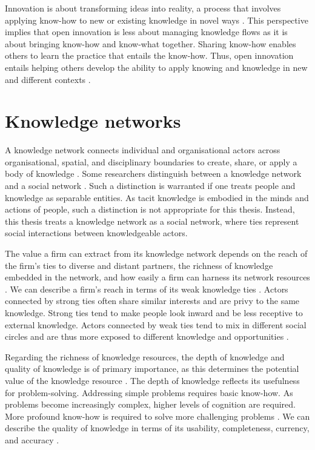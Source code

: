 Innovation is about transforming ideas into reality, a process that involves applying know-how to new or existing knowledge in novel ways \citep{van1986central,quintane2011innovation,garud2013perspectives}. This perspective implies that open innovation is less about managing knowledge flows as it is about bringing know-how and know-what together. Sharing know-how enables others to learn the practice that entails the know-how. Thus, open innovation entails helping others develop the ability to apply knowing and knowledge in new and different contexts \citep{van1986central,goksel2016can}. 

\section{Knowledge networks}

A knowledge network connects individual and organisational actors across organisational, spatial, and disciplinary boundaries to create, share, or apply a body of knowledge \citep{pugh2013designing}. Some researchers distinguish between a knowledge network and a social network \citep[e.g.][]{yayavaram2008decomposability,wang2014knowledge,brennecke2017firm}. Such a distinction is warranted if one treats people and knowledge as separable entities. As tacit knowledge is embodied in the minds and actions of people, such a distinction is not appropriate for this thesis. Instead, this thesis treats a knowledge network as a social network, where ties represent social interactions between knowledgeable actors. \medskip

The value a firm can extract from its knowledge network depends on the reach of the firm's ties to diverse and distant partners, the richness of knowledge embedded in the network, and how easily a firm can harness its network resources \citep{gulati2011networks}. We can describe a firm's reach in terms of its weak knowledge ties \citep{hansen1999search}. Actors connected by strong ties often share similar interests and are privy to the same knowledge. Strong ties tend to make people look inward and be less receptive to external knowledge. Actors connected by weak ties tend to mix in different social circles and are thus more exposed to different knowledge and opportunities \citep{granovetter1973strength}. \medskip

Regarding the richness of knowledge resources, the depth of knowledge and quality of knowledge is of primary importance, as this determines the potential value of the knowledge resource \citep{davenport1998working,kane2005knowledge}. The depth of knowledge reflects its usefulness for problem-solving. Addressing simple problems requires basic know-how. As problems become increasingly complex, higher levels of cognition are required. More profound know-how is required to solve more challenging problems \citep{webb2002depth,bennet2008depth}. We can describe the quality of knowledge in terms of its usability, completeness, currency, and accuracy \citep{wixom2005theoretical}. \medskip

